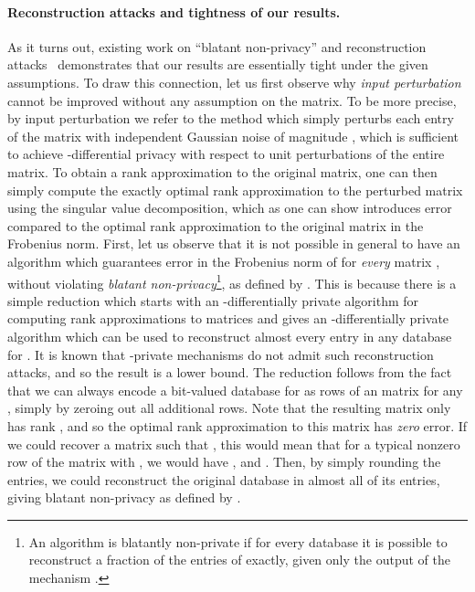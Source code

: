 \documentclass[letterpaper,11pt]{article}
\theoremstyle{definition}
\begin{document}
\paragraph{Reconstruction attacks and tightness of our results.}
As it turns out, existing work on ``blatant non-privacy'' and
reconstruction attacks~\cite{DinurN03} demonstrates that our results are
essentially tight under the given assumptions. To draw this connection, let us
first observe why \emph{input perturbation} cannot be improved without any
assumption on the matrix. To be more precise, by input perturbation we refer
to the method which simply perturbs each entry of the matrix with independent
Gaussian noise of magnitude
, which is sufficient to
achieve -differential privacy with respect to unit 
perturbations of the entire matrix. To obtain a rank  approximation to the
original matrix, one can then simply compute the exactly optimal rank 
approximation to the perturbed matrix using the singular value decomposition,
which as one can show introduces error 
compared to the optimal rank  approximation to the original matrix in the
Frobenius norm. First, let us observe that it is not possible in general to
have an algorithm which guarantees error in the Frobenius norm of
 for \emph{every} matrix , without violating \emph{blatant
non-privacy}\footnote{An algorithm  is blatantly non-private if for every
database  it is possible to reconstruct a  fraction of
the entries of  exactly, given only the output of the mechanism .},
as defined by \cite{DinurN03}.  This is because there is a simple
reduction which starts with an -differentially private
algorithm for computing rank  approximations to matrices  and gives an -differentially
private algorithm which can be used to reconstruct almost every entry in any
database  for . It is known that
-private mechanisms do not admit such reconstruction
attacks, 
and so the result is a lower
bound. The reduction follows from the fact that we can always encode a
bit-valued database  for  as  rows of an
 matrix for any , simply by zeroing out all additional
 rows. Note that the resulting matrix only has rank , and so the
optimal rank  approximation to this matrix has \emph{zero}
error. If we could recover a  matrix  such that , this would mean that for a typical nonzero row  of the
matrix with , we would have , and . Then, by simply rounding the entries, we could
reconstruct the original database  in almost all of its entries, giving
blatant non-privacy as defined by \cite{DinurN03}.
\end{document}

